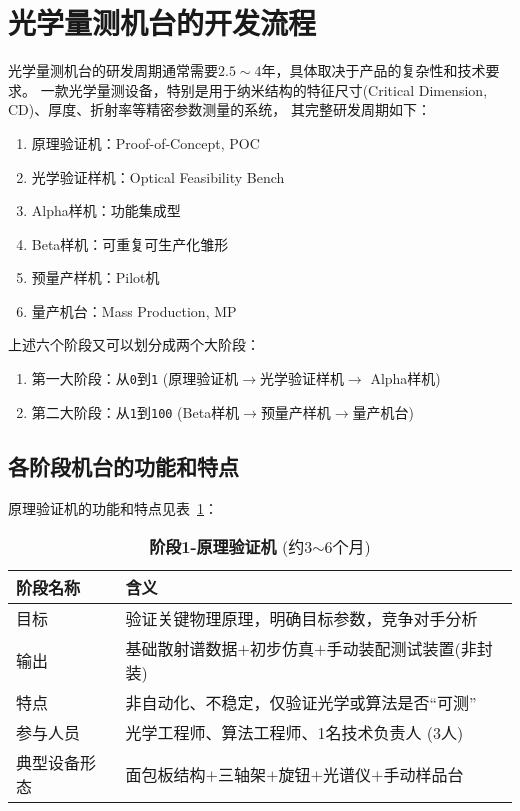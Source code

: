 
\newpage

\section{光学量测机台的开发流程~\label{光学量测机台的开发流程}}
光学量测机台的研发周期通常需要$2.5\sim4$年，具体取决于产品的复杂性和技术要求。
一款光学量测设备，特别是用于纳米结构的特征尺寸(Critical Dimension, CD)、厚度、折射率等精密参数测量的系统，
其完整研发周期如下：
\begin{enumerate}
\setlength{\itemsep}{2pt}
\setlength{\parsep}{0pt}
\setlength{\parskip}{0pt}
\item 原理验证机：Proof-of-Concept, POC 
\item 光学验证样机：Optical Feasibility Bench
\item Alpha样机：功能集成型
\item Beta样机：可重复可生产化雏形
\item 预量产样机：Pilot机
\item 量产机台：Mass Production, MP
\end{enumerate}
上述六个阶段又可以划分成两个大阶段：
\begin{enumerate}
\setlength{\itemsep}{2pt}
\setlength{\parsep}{0pt}
\setlength{\parskip}{0pt}
\item 第一大阶段：从\texttt{0}到\texttt{1} (原理验证机$\rightarrow$光学验证样机$\rightarrow$ Alpha样机)
\item 第二大阶段：从\texttt{1}到\texttt{100} (Beta样机$\rightarrow$预量产样机$\rightarrow$量产机台)
\end{enumerate}


\subsection{各阶段机台的功能和特点~\label{各阶段机台的功能和特点}}
原理验证机的功能和特点见表~\ref{table:POC}：
\begin{table}[h!]
\centering
\caption{\textbf{阶段1-原理验证机} (约3$\sim$6个月)}
\label{table:POC}
\begin{tabular}{l|l}
\hline\hline
\textbf{阶段名称} & \textbf{含义} \\ \hline
目标 & 验证关键物理原理，明确目标参数，竞争对手分析 \\ \hline
输出 & 基础散射谱数据$+$初步仿真$+$手动装配测试装置(非封装) \\ \hline
特点 & 非自动化、不稳定，仅验证光学或算法是否“可测” \\ \hline
参与人员 & 光学工程师、算法工程师、1名技术负责人 (3人) \\ \hline
典型设备形态 & 面包板结构$+$三轴架$+$旋钮$+$光谱仪$+$手动样品台 \\
\hline\hline
\end{tabular}
\end{table}

